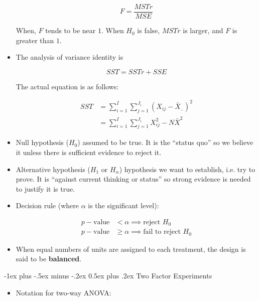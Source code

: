 \documentclass[9pt,landscape]{memoir}
\makeatletter
\renewcommand{\section}{\@startsection{section}{1}{0mm}%
    {-1ex plus -.5ex minus -.2ex}%
    {0.5ex plus .2ex}%
{\normalfont\large\bfseries}}
\makeatother
\begin{document}
\begin{multicols}{3}
\begin{itemize}
            \begin{equation*}
                F = \frac{MSTr}{MSE}
            \end{equation*}

            When, $F$ tends to be near $1$. When $H_0$ is false, $MSTr$ is larger, and $F$ is greater than $1$.

        \item The analysis of variance identity is

            \begin{equation*}
                SST = SSTr + SSE
            \end{equation*}

            The actual equation is as follows:

            \begin{align*}
                SST &= \sum _{i = 1} ^I \sum_{j = 1} ^{J_i} {(X_{ij} - \bar{X}_{..})}^2  \\
                    &= \sum _{i = 1} ^I \sum_{j = 1} ^{J_i} X_{ij} ^2 - N\bar{X}^2
            \end{align*}

        \item Null hypothesis ($H_0$) assumed to be true. It is the ``status quo'' so we believe it unless there is sufficient evidence to reject it.
        \item Alternative hypothesis ($H_1$ or $H_\alpha$) hypothesis we want to establish, i.e. try to prove. It is ``against current thinking or status'' so strong evidence is needed to justify it is true.

        \item Decision rule (where $\alpha$ is the significant level):

            \begin{align*}
                p-\text{value} &< \alpha \implies \text{reject $H_0$} \\
                p-\text{value} &\geq \alpha \implies \text{fail to reject $H_0$}
            \end{align*}

        \item When equal numbers of units are assigned to each treatment, the design is said to be \textbf{balanced}.
    \end{itemize}


    \section{Two Factor Experiments}
    \begin{itemize}
        \item Notation for two-way ANOVA:


\end{itemize}
\end{multicols}
\end{document}
